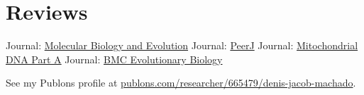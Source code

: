 
\section{Reviews}
		{Journal: \href{https://academic.oup.com/mbe}{Molecular Biology and Evolution}}
	\cvline{---}
		{Journal: \href{https://peerj.com/}{PeerJ}}
	\cvline{---}
		{Journal: \href{https://www.tandfonline.com/loi/imdn20}{Mitochondrial DNA Part A}}
		{Journal: \href{https://bmcevolbiol.biomedcentral.com/}{BMC Evolutionary Biology}}

\vspace{0.5em}

See my Publons profile at \href{https://publons.com/researcher/665479/denis-jacob-machado/}{publons.com/researcher/665479/denis-jacob-machado}.
